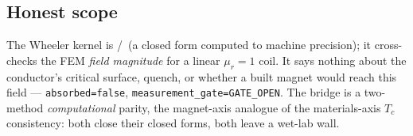 \subsection{Honest scope}
\label{app:wh-honest}

The Wheeler kernel is \tierBlue/\tierGreen\ (a closed form computed to
machine precision); it cross-checks the FEM \emph{field magnitude} for a
linear $\mu_r\!=\!1$ coil. It says nothing about the conductor's critical
surface, quench, or whether a built magnet would reach this field ---
\texttt{absorbed=false}, \texttt{measurement\_gate=GATE\_OPEN}. The bridge
is a two-method \emph{computational} parity, the magnet-axis analogue of
the materials-axis $T_c$ consistency: both close their closed forms, both
leave a wet-lab wall.

